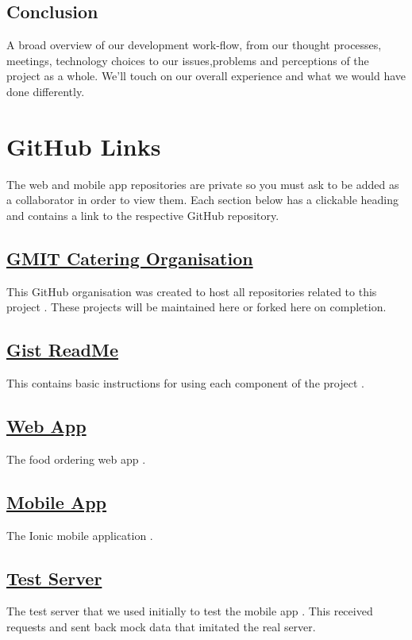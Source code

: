 \subsection*{Conclusion}
A broad overview of our development work-flow, from our thought processes, meetings, technology choices to our issues,problems and perceptions of the project as a whole.
We'll touch on our overall experience and what we would have done differently.

\section{GitHub Links}
The web and mobile app repositories are private so you must ask to be added as a collaborator in order to view them.
Each section below has a clickable heading and contains a link to the respective GitHub repository.

\subsection*{\href{https://github.com/GMIT-Catering}{GMIT Catering Organisation}}
This GitHub organisation was created to host all repositories related to this project \cite{github_org}.
These projects will be maintained here or forked here on completion.

\subsection*{\href{http://gmit-catering.github.io/final-year-project-template/}{Gist ReadMe}}
This contains basic instructions for using each component of the project \cite{gh_gist_readme}.

\subsection*{\href{https://github.com/VMarisevs/CanteenOrderSystem}{Web App}}
The food ordering web app \cite{gh_web_app}.

\subsection*{\href{https://github.com/RonanC/gmit-catering}{Mobile App}}
The Ionic mobile application \cite{gh_mobile_app}.

\subsection*{\href{https://github.com/RonanC/gmit-catering-test-server}{Test Server}}
The test server that we used initially to test the mobile app \cite{gh_test_server}.
This received requests and sent back mock data that imitated the real server.

